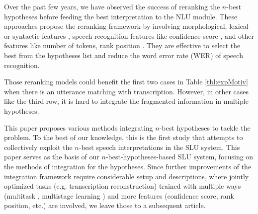 Over the past few years, we have observed the success of reranking the $n$-best hypotheses 
\citep{peng2013search, charniak2005coarse, morbini2012reranking,  dikici2012classification, Sak2011DiscriminativeRO, sak2010fly,discriminative, collins2005discriminative, chan2004improving}
before feeding the best interpretation to the NLU module. These approaches propose the reranking framework by involving morphological, lexical or syntactic features \citep{discriminative, collins2005discriminative, chan2004improving}, speech recognition features like confidence score \citep{peng2013search, morbini2012reranking}, and other features like number of tokens, rank position \citep{peng2013search}.  They are effective to select the best from the hypotheses list and reduce the word error rate (WER) \citep{oba2007approach} of speech recognition. 

Those reranking models could benefit the first two cases in Table \ref{tbl:expMotiv} when there is an utterance matching with transcription. However, in other cases like the third row, it is hard to integrate the fragmented information  in multiple hypotheses. 

This paper proposes various methods integrating $n$-best hypotheses to tackle the problem. To the best of our knowledge, this is the first study that attempts to collectively exploit the $n$-best speech interpretations in the SLU system.  This paper serves as the basis of our $n$-best-hypotheses-based SLU system, focusing on the methods of integration for the hypotheses. 
Since further improvements of the integration framework require considerable setup and descriptions, where jointly optimized tasks (e.g. transcription reconstruction) trained with multiple ways (multitask \citep{caruana1997multitask}, multistage learning \citep{gong2013multi}) and more features (confidence score, rank position, etc.) are involved, we leave those to a subsequent article.

